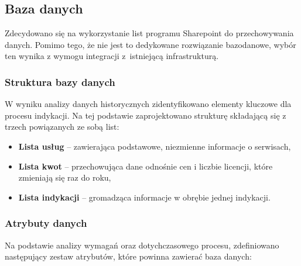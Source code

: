 \subsection{Baza danych}

Zdecydowano się na wykorzystanie list programu Sharepoint do przechowywania danych. Pomimo tego, że nie jest to dedykowane rozwiązanie bazodanowe, wybór ten wynika z wymogu integracji z~istniejącą infrastrukturą.

\subsubsection*{Struktura bazy danych}
\label{Subsec: StrukturaBazyDanych}
\label{instruction-link}
W wyniku analizy danych historycznych zidentyfikowano elementy kluczowe dla procesu indykacji. Na tej podstawie zaprojektowano strukturę składającą się z trzech powiązanych ze sobą list:

\begin{itemize}
  \item \textbf{Lista usług} -- zawierająca podstawowe, niezmienne informacje o serwisach,
  \item \textbf{Lista kwot} -- przechowująca dane odnośnie cen i liczbie licencji, które zmieniają się raz do roku,
  \item \textbf{Lista indykacji} -- gromadząca informacje w obrębie jednej indykacji.
\end{itemize}
\subsubsection*{Atrybuty danych}
Na podstawie analizy wymagań oraz dotychczasowego procesu, zdefiniowano następujący zestaw atrybutów, które powinna zawierać baza danych:

